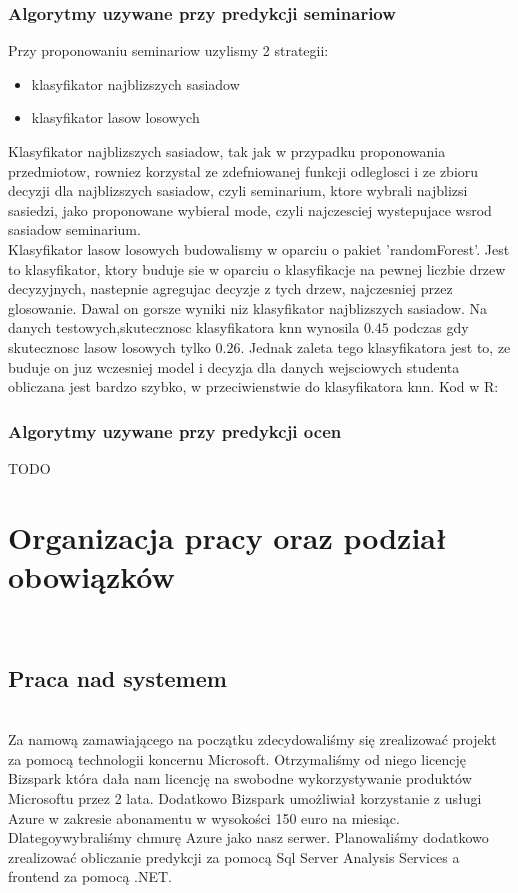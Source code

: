 \documentclass[licencjacka]{pracamgr}
\begin{document}
\subsection{Algorytmy uzywane przy predykcji seminariow}
Przy proponowaniu seminariow uzylismy 2 strategii:
\begin{itemize}
 \item klasyfikator najblizszych sasiadow
 \item klasyfikator lasow losowych
\end{itemize}
Klasyfikator najblizszych sasiadow, tak jak w przypadku proponowania przedmiotow, rowniez korzystal ze zdefniowanej funkcji
odleglosci i ze zbioru decyzji dla najblizszych sasiadow, czyli seminarium, ktore wybrali najblizsi sasiedzi, jako proponowane
wybieral mode, czyli najczesciej wystepujace wsrod sasiadow seminarium. \\
Klasyfikator lasow losowych budowalismy w oparciu o pakiet 'randomForest'. Jest to klasyfikator, ktory buduje sie w oparciu o
klasyfikacje na pewnej liczbie drzew decyzyjnych, nastepnie agregujac decyzje z tych drzew, najczesniej przez glosowanie.
Dawal on gorsze wyniki niz klasyfikator najblizszych sasiadow.
Na danych testowych,skutecznosc klasyfikatora knn wynosila $0.45$ podczas gdy skutecznosc lasow losowych tylko $0.26$. Jednak
zaleta tego klasyfikatora jest to, ze buduje on juz wczesniej model i decyzja dla danych wejsciowych studenta obliczana
jest bardzo szybko, w przeciwienstwie do klasyfikatora knn. Kod w R:

\subsection{Algorytmy uzywane przy predykcji ocen}
TODO

\chapter{Organizacja pracy oraz podział obowiązków} ~\\

\section{Praca nad systemem} ~\\

Za namową zamawiającego na początku zdecydowaliśmy się zrealizować projekt za pomocą technologii koncernu Microsoft. Otrzymaliśmy od niego licencję Bizspark która dała nam licencję na swobodne wykorzystywanie produktów Microsoftu przez 2 lata. Dodatkowo Bizspark umożliwiał korzystanie z usługi Azure w zakresie abonamentu w wysokości 150 euro na miesiąc. Dlategoywybraliśmy chmurę Azure jako nasz serwer. Planowaliśmy dodatkowo zrealizować obliczanie predykcji za pomocą Sql Server Analysis Services a frontend za pomocą .NET. \\
\end{document}
